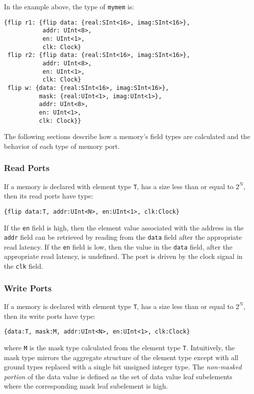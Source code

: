 \documentclass[12pt]{article}
\begin{document}
In the example above, the type of \verb|mymem| is:
\begin{verbatim}
{flip r1: {flip data: {real:SInt<16>, imag:SInt<16>}, 
           addr: UInt<8>, 
           en: UInt<1>, 
           clk: Clock}
 flip r2: {flip data: {real:SInt<16>, imag:SInt<16>}, 
           addr: UInt<8>, 
           en: UInt<1>, 
           clk: Clock}
 flip w: {data: {real:SInt<16>, imag:SInt<16>}, 
          mask: {real:UInt<1>, imag:UInt<1>}, 
          addr: UInt<8>, 
          en: UInt<1>, 
          clk: Clock}}
\end{verbatim}

The following sections describe how a memory's field types are calculated and the behavior of each type of memory port.

\subsubsection{Read Ports}
If a memory is declared with element type \verb|T|, has a size less than or equal to $2^N$, then its read ports have type:
\begin{verbatim}
{flip data:T, addr:UInt<N>, en:UInt<1>, clk:Clock}
\end{verbatim}

If the \verb|en| field is high, then the element value associated with the address in the \verb|addr| field can be retrieved by reading from the \verb|data| field after the appropriate read latency. If the \verb|en| field is low, then the value in the \verb|data| field, after the appropriate read latency, is undefined. The port is driven by the clock signal in the \verb|clk| field.

\subsubsection{Write Ports}
If a memory is declared with element type \verb|T|, has a size less than or equal to $2^N$, then its write ports have type:
\begin{verbatim}
{data:T, mask:M, addr:UInt<N>, en:UInt<1>, clk:Clock}
\end{verbatim}
where \verb|M| is the mask type calculated from the element type \verb|T|. Intuitively, the mask type mirrors the aggregate structure of the element type except with all ground types replaced with a single bit unsigned integer type. The {\em non-masked portion} of the data value is defined as the set of data value leaf subelements where the corresponding mask leaf subelement is high.
\end{document}
